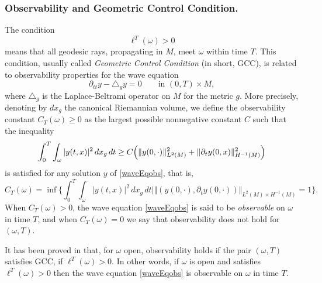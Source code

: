 \documentclass[10pt]{amsart}
\theoremstyle{definition}
\begin{document}
\subsubsection*{Observability and Geometric Control Condition.}
The condition
\[
\ell^T(\omega)>0
\]
means that all geodesic rays, propagating in $M$, meet $\omega$ within time $T$. This condition, usually called \textit{Geometric Control Condition} (in short, GCC), is related to observability properties for the wave equation
\begin{equation}\label{waveEqobs}
\partial_{tt}y- \triangle_g y=0\qquad \textrm{in }(0,T)\times M,
\end{equation}
where $\triangle_g$ is the Laplace-Beltrami operator on $M$ for the metric $g$.
More precisely, denoting by $dx_g$ the canonical Riemannian volume, we define the observability constant $C_T(\omega)\geq 0$ as the largest possible nonnegative constant $C$ such that the inequality
\begin{equation} \label{ineqobsw}
\int_0^T \int_\omega |y(t,x)|^2 \, dx_g \, dt \geq C \Bigl( \Vert y(0,\cdot)\Vert_{L^2(M)}^2 + \Vert\partial_t y(0,x)\Vert_{H^{-1}(M)}^2 \Bigr)
\end{equation}
is satisfied for any solution $y$ of \eqref{waveEqobs}, that is,
\[
C_T(\omega) = \inf \biggl\{ \int_0^T \int_\omega | y(t,x)|^2 \, dx_g \, dt \mid \Vert (y(0,\cdot),\partial_t y(0,\cdot))\Vert_{L^2(M)\times H^{-1}(M)}=1 \biggr\}.
\]
When $C_T(\omega)>0$, the wave equation \eqref{waveEqobs} is said to be \textit{observable} on $\omega$ in time $T$, and when $C_T(\omega)=0$ we say that observability does not hold for $(\omega,T)$.

It has been proved in \cite{BardosLebeauRauch,rauch-taylor} that, for $\omega$ open, observability holds if the pair $(\omega,T)$ satisfies GCC, \ie if $\ell^T(\omega)>0$.
In other words, if $\omega$ is open and satisfies $\ell^T(\omega)>0$ then the wave equation \eqref{waveEqobs} is observable on $\omega$ in time $T$.
\end{document}
